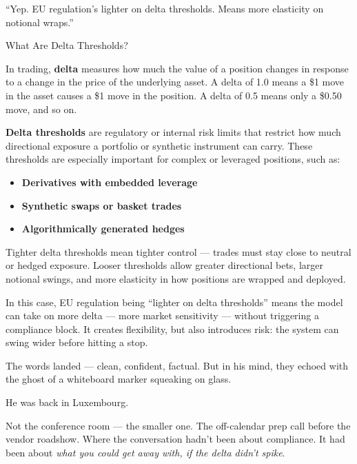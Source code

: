 “Yep. EU regulation’s lighter on delta thresholds. Means more elasticity on notional wraps.”

\medskip

\begin{TechnicalSidebar}{What Are Delta Thresholds?}

  In trading, \textbf{delta} measures how much the value of a position changes in response to a change in the price 
  of the underlying asset.  
  A delta of 1.0 means a \$1 move in the asset causes a \$1 move in the position. A delta of 0.5 means only a \$0.50 
  move, and so on.

  \medskip

  \textbf{Delta thresholds} are regulatory or internal risk limits that restrict how much directional exposure a 
  portfolio or synthetic instrument can carry.  
  These thresholds are especially important for complex or leveraged positions, such as:

  \medskip

  \begin{itemize}
    \item \textbf{Derivatives with embedded leverage}
    \item \textbf{Synthetic swaps or basket trades}
    \item \textbf{Algorithmically generated hedges}
  \end{itemize}

  \medskip

  Tighter delta thresholds mean tighter control — trades must stay close to neutral or hedged exposure.  
  Looser thresholds allow greater directional bets, larger notional swings, and more elasticity in how positions 
  are wrapped and deployed.

  \medskip

  In this case, EU regulation being “lighter on delta thresholds” means the model can take on more delta — more 
  market sensitivity —  
  without triggering a compliance block. It creates flexibility, but also introduces risk: the system can swing 
  wider before hitting a stop.

\end{TechnicalSidebar}

\medskip

The words landed — clean, confident, factual.
But in his mind, they echoed with the ghost of a whiteboard marker squeaking on glass.

He was back in Luxembourg.

Not the conference room — the smaller one. The off-calendar prep call before the vendor roadshow.
Where the conversation hadn’t been about compliance. It had been about \textit{what you could get away with, if the delta didn’t spike}.

